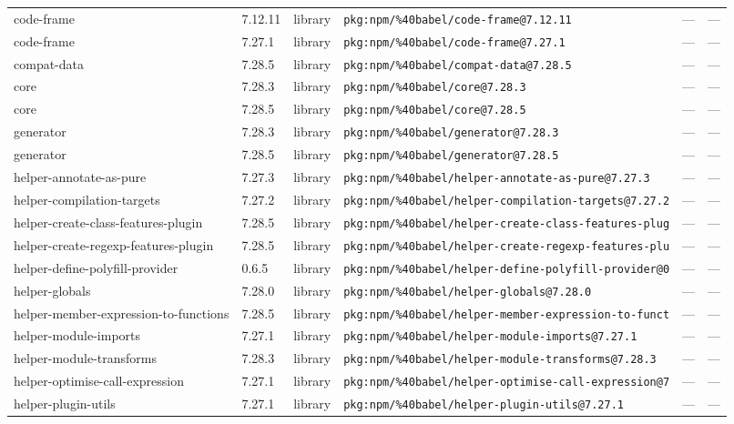 \documentclass[11pt]{article}
\begin{document}
\begin{longtable}{|l|l|l|p{2.2cm}|l|p{4cm}|}
code-frame & 7.12.11 & library & \texttt{pkg:npm/\%40babel/code-frame@7.12.11} & — & — \\
code-frame & 7.27.1 & library & \texttt{pkg:npm/\%40babel/code-frame@7.27.1} & — & — \\
compat-data & 7.28.5 & library & \texttt{pkg:npm/\%40babel/compat-data@7.28.5} & — & — \\
core & 7.28.3 & library & \texttt{pkg:npm/\%40babel/core@7.28.3} & — & — \\
core & 7.28.5 & library & \texttt{pkg:npm/\%40babel/core@7.28.5} & — & — \\
generator & 7.28.3 & library & \texttt{pkg:npm/\%40babel/generator@7.28.3} & — & — \\
generator & 7.28.5 & library & \texttt{pkg:npm/\%40babel/generator@7.28.5} & — & — \\
helper-annotate-as-pure & 7.27.3 & library & \texttt{pkg:npm/\%40babel/helper-annotate-as-pure@7.27.3} & — & — \\
helper-compilation-targets & 7.27.2 & library & \texttt{pkg:npm/\%40babel/helper-compilation-targets@7.27.2} & — & — \\
helper-create-class-features-plugin & 7.28.5 & library & \texttt{pkg:npm/\%40babel/helper-create-class-features-plug} & — & — \\
helper-create-regexp-features-plugin & 7.28.5 & library & \texttt{pkg:npm/\%40babel/helper-create-regexp-features-plu} & — & — \\
helper-define-polyfill-provider & 0.6.5 & library & \texttt{pkg:npm/\%40babel/helper-define-polyfill-provider@0} & — & — \\
helper-globals & 7.28.0 & library & \texttt{pkg:npm/\%40babel/helper-globals@7.28.0} & — & — \\
helper-member-expression-to-functions & 7.28.5 & library & \texttt{pkg:npm/\%40babel/helper-member-expression-to-funct} & — & — \\
helper-module-imports & 7.27.1 & library & \texttt{pkg:npm/\%40babel/helper-module-imports@7.27.1} & — & — \\
helper-module-transforms & 7.28.3 & library & \texttt{pkg:npm/\%40babel/helper-module-transforms@7.28.3} & — & — \\
helper-optimise-call-expression & 7.27.1 & library & \texttt{pkg:npm/\%40babel/helper-optimise-call-expression@7} & — & — \\
helper-plugin-utils & 7.27.1 & library & \texttt{pkg:npm/\%40babel/helper-plugin-utils@7.27.1} & — & — \\

\end{longtable}
\end{document}
